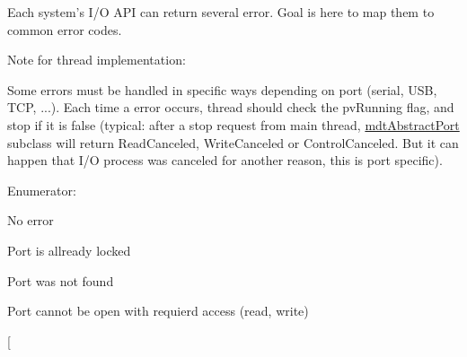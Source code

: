 Each system's I/O API can return several error. Goal is here to map them to common error codes.

Note for thread implementation:\par
 Some errors must be handled in specific ways depending on port (serial, USB, TCP, ...). Each time a error occurs, thread should check the pvRunning flag, and stop if it is false (typical: after a stop request from main thread, \hyperlink{classmdt_abstract_port}{mdtAbstractPort} subclass will return ReadCanceled, WriteCanceled or ControlCanceled. But it can happen that I/O process was canceled for another reason, this is port specific). \begin{Desc}
\item[Enumerator: ]\par
\begin{description}
\item[{\em 
\hypertarget{classmdt_abstract_port_ad4121bb930c95887e77f8bafa065a85eab898bd273effe5cb4ed1a399a2d4baad}{
NoError}
\label{classmdt_abstract_port_ad4121bb930c95887e77f8bafa065a85eab898bd273effe5cb4ed1a399a2d4baad}
}]No error \item[{\em 
\hypertarget{classmdt_abstract_port_ad4121bb930c95887e77f8bafa065a85eaedd63daf0db75794bb8e8e467da9575c}{
PortLocked}
\label{classmdt_abstract_port_ad4121bb930c95887e77f8bafa065a85eaedd63daf0db75794bb8e8e467da9575c}
}]Port is allready locked \item[{\em 
\hypertarget{classmdt_abstract_port_ad4121bb930c95887e77f8bafa065a85ea54a896ba3ff98896390e87bfe1f29eb0}{
PortNotFound}
\label{classmdt_abstract_port_ad4121bb930c95887e77f8bafa065a85ea54a896ba3ff98896390e87bfe1f29eb0}
}]Port was not found \item[{\em 
\hypertarget{classmdt_abstract_port_ad4121bb930c95887e77f8bafa065a85eaee5a84e59e9dc5fcf27cac57068bb1f4}{
PortAccess}
\label{classmdt_abstract_port_ad4121bb930c95887e77f8bafa065a85eaee5a84e59e9dc5fcf27cac57068bb1f4}
}]Port cannot be open with requierd access (read, write) \item[{\em 
}
\end{description}
\end{Desc}
